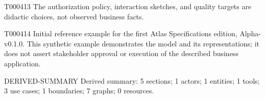 \documentclass[11pt,a4paper]{article}
\begin{document}
\begin{atlasparagraph}{T000413}
The authorization policy, interaction sketches, and quality targets are didactic choices, not observed business facts.
\end{atlasparagraph}
\begin{atlasparagraph}{T000414}
Initial reference example for the first Atlas Specifications edition, Alpha-v0.1.0. This synthetic example demonstrates the model and its representations; it does not assert stakeholder approval or execution of the described business application.
\end{atlasparagraph}
\begin{atlasderived}{DERIVED-SUMMARY}
Derived summary: 5 sections; 1 actors; 1 entities; 1 tools; 3 use cases; 1 boundaries; 7 graphs; 0 resources.
\end{atlasderived}
%
\end{document}
